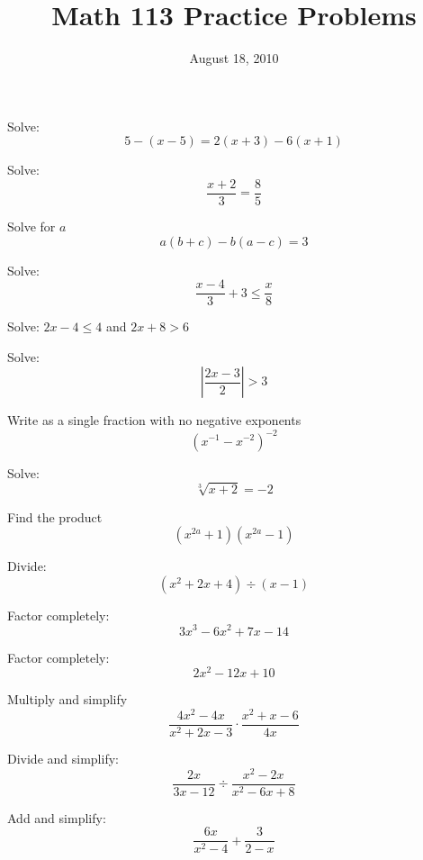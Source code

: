 \documentclass[fleqn,addpoints]{exam}
\title{Math 113 Practice Problems}
\date{August 18, 2010}
\begin{document}
\maketitle

\begin{questions}

\question 
Solve:
\[
  5 - (x - 5) = 2(x+3) - 6(x+1)
\]
\vspace{1 cm}

\question 
Solve:
\[
  \frac{x+2}{3} = \frac{8}{5}
\]
\vspace{1 cm}

\question
Solve for $a$
\[
  a(b + c) - b(a - c) = 3
\]
\vspace{1 cm}

\question
Solve:
\[
  \frac{x-4}{3} +3 \leq \frac{x}{8}
\]
\vspace{1 cm}

\question
Solve:
$2x-4 \leq 4$ and $2x + 8 > 6$
\vspace{1 cm}

\question
Solve:
\[
 \left | \frac{2x - 3}{2} \right | > 3
\]
\vspace{1 cm}

\question
Write as a single fraction with no negative exponents
\[
 (x^{-1} - x^{-2})^{-2}
\]
\vspace{1 cm}

\question
Solve:
\[
  \sqrt[3]{x+2} = -2
\]
\vspace{1 cm}

\question
Find the product
\[
  (x^{2a} +1)(x^{2a} - 1)
\]
\vspace{1 cm}

\question
Divide:
\[ 
  (x^2 + 2x + 4) \div (x-1)
\]
\vspace{1 cm}

\question
Factor completely:
\[
  3x^3 - 6x^2 + 7x - 14
\]
\vspace{1 cm}

\question
Factor completely:
\[
  2x^2 - 12x + 10
\]
\vspace{1 cm}

\question
Multiply and simplify
\[
  \frac{4x^2 - 4x}{x^2 + 2x - 3} \cdot \frac{x^2 + x - 6}{4x}
\]
\vspace{1 cm}

\question
Divide and simplify:
\[
  \frac{2x}{3x-12} \div \frac{x^2-2x}{x^2-6x+8}
\]
\vspace{1 cm}

\question
Add and simplify:
\[
  \frac{6x}{x^2-4} + \frac{3}{2-x}
\]
\vspace{1 cm}


\end{questions}
\end{document}
